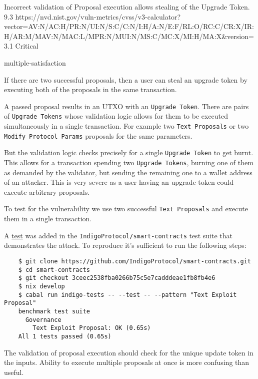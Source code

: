 \vuln
    { %
    Incorrect validation of Proposal execution allows stealing of the Upgrade Token.
    }
    { %
      9.3
    }
    { %
    https://nvd.nist.gov/vuln-metrics/cvss/v3-calculator?vector=AV:N/AC:H/PR:N/UI:N/S:C/C:N/I:H/A:N/E:F/RL:O/RC:C/CR:X/IR:H/AR:M/MAV:N/MAC:L/MPR:N/MUI:N/MS:C/MC:X/MI:H/MA:X&version=3.1
    }
    { %
    Critical
    }
    { %
    \item multiple-satisfaction
    }
    { %
    If there are two successful proposals, then a user can steal an upgrade token by executing both of the proposals in the same transaction. 

    A passed proposal results in an UTXO with an \texttt{Upgrade Token}. There are pairs of \texttt{Upgrade Tokens} whose validation logic allows for them to be executed simultaneously in a single transaction. For example two \texttt{Text Proposals} or two \texttt{Modify Protocol Params} proposals for the same parameters.
    
    But the validation logic checks precisely for a single \texttt{Upgrade Token} to get burnt. This allows for a transaction spending two \texttt{Upgrade Tokens}, burning one of them as demanded by the validator, but sending the remaining one to a wallet address of an attacker. This is very severe as a user having an upgrade token could execute arbitrary proposals.
    }
    { %
    To test for the vulnerability we use two successful \texttt{Text Proposals} and execute them in a single transaction. 

    A \href{https://github.com/IndigoProtocol/smart-contracts/blob/3ceec2538fba0266b75c5e7cadddeae1fb8fb4e6/tests/Spec/Governance/Benchmark.hs#L197}{test} was added in the \texttt{IndigoProtocol/smart-contracts} test suite that demonstrates the attack. To reproduce it's sufficient to run the following steps:
    \begin{lstlisting}
    $ git clone https://github.com/IndigoProtocol/smart-contracts.git
    $ cd smart-contracts
    $ git checkout 3ceec2538fba0266b75c5e7cadddeae1fb8fb4e6
    $ nix develop
    $ cabal run indigo-tests -- --test -- --pattern "Text Exploit Proposal"
    benchmark test suite
      Governance
        Text Exploit Proposal: OK (0.65s)
    All 1 tests passed (0.65s)
    \end{lstlisting}
    
    }
    { %
    The validation of proposal execution should check for the unique update token in the inputs. Ability to execute multiple proposals at once is more confusing than useful.
    }
